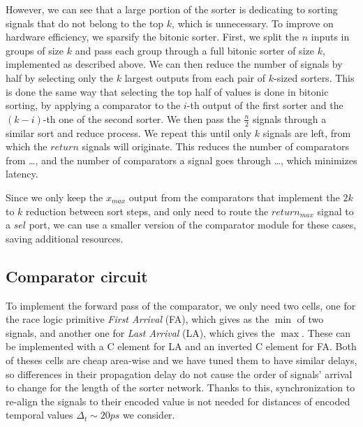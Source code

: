 \documentclass{article}
\begin{document}
However, we can see that a large portion of the sorter is
dedicating to sorting signals that do not belong to the top
$k$, which is unnecessary. To improve on hardware
efficiency, we sparsify the bitonic sorter. First, we split
the $n$ inputs in groups of size $k$ and pass each group
through a full bitonic sorter of size $k$, implemented as
described above. We can then reduce the number of signals by
half by selecting only the $k$ largest outputs from each
pair of $k$-sized sorters. This is done the same way that
selecting the top half of values is done in bitonic sorting,
by applying a comparator to the $i$-th output of the first
sorter and the $(k-i)$-th one of the second sorter. We then
pass the $\frac{n}{2}$ signals through a similar sort and
reduce process. We repeat this until only $k$ signals are
left, from which the $return$ signals will originate. This
reduces the number of comparators from \dots, and the number
of comparators a signal goes through \dots, which minimizes
latency.

Since we only keep the $x_{max}$ output from the comparators
that implement the $2k$ to $k$ reduction between sort steps,
and only need to route the $return_{max}$ signal to a $sel$
port, we can use a smaller version of the comparator module
for these cases, saving additional resources.

\subsection{Comparator circuit}

To implement the forward pass of the comparator, we only
need two cells, one for the race logic primitive
\textit{First Arrival} (FA), which gives as the $\min$ of
two signals, and another one for \textit{Last Arrival} (LA),
which gives the $\max$. These can be implemented with a C
element for LA and an inverted C element for FA. Both of
theses cells are cheap area-wise and we have tuned them to
have similar delays, so differences in their propagation
delay do not cause the order of signals' arrival to change
for the length of the sorter network. Thanks to this,
synchronization to re-align the signals to their encoded
value is not needed for distances of encoded temporal values
$\Delta_t \sim 20ps$ we consider.
\end{document}
